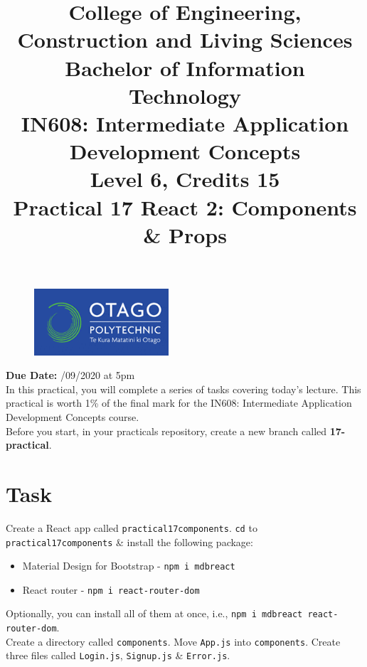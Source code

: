 \documentclass{article}
\author{}
\begin{document}
\begin{figure}
	\centering
	\includegraphics[width=50mm]{./img/logo.png}
\end{figure}

\title{College of Engineering, Construction and Living Sciences\\Bachelor of Information Technology\\IN608: Intermediate Application Development Concepts\\Level 6, Credits 15\\\textbf{Practical 17 React 2: Components \& Props}} 
\date{}
\maketitle

\textbf{Due Date:} /09/2020 at 5pm \\

In this practical, you will complete a series of tasks covering today's lecture. This practical is worth 1\% of the final mark for the IN608: Intermediate Application Development Concepts course. \\

Before you start, in your practicals repository, create a new branch called \textbf{17-practical}.

\section*{Task} 
Create a React app called \texttt{practical17components}. \texttt{cd} to \texttt{practical17components} \& install the following package:
\begin{itemize}
  \item Material Design for Bootstrap - \texttt{npm i mdbreact}
  \item React router - \texttt{npm i react-router-dom}
\end{itemize}

Optionally, you can install all of them at once, i.e., \texttt{npm i mdbreact react-router-dom}. \\

Create a directory called \texttt{components}. Move \texttt{App.js} into \texttt{components}. Create three files called \texttt{Login.js}, \texttt{Signup.js} \& \texttt{Error.js}. \\
\end{document}
